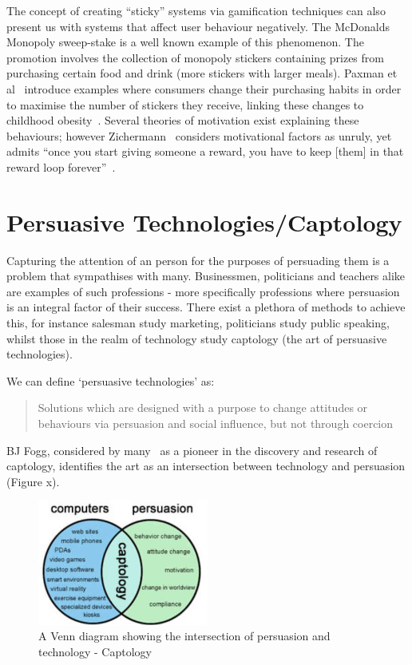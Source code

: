 The concept of creating ``sticky'' systems via gamification techniques can also present us with systems that affect user behaviour negatively. The McDonalds Monopoly sweep-stake is a well known example of this phenomenon. The promotion involves the collection of monopoly stickers containing prizes from purchasing certain food and drink (more stickers with larger meals). Paxman et al~\cite{mcdonalds} introduce examples where consumers change their purchasing habits in order to maximise the number of stickers they receive, linking these changes to childhood obesity~\cite{mcdonalds}. Several theories of motivation exist explaining these behaviours; however Zichermann~\cite{zichermann2011gamification} considers motivational factors as unruly, yet admits ``once you start giving someone a reward, you have to keep [them] in that reward loop forever''~\cite[p.~27]{zichermann2011gamification}.

\section{Persuasive Technologies/Captology}
Capturing the attention of an person for the purposes of persuading them is a problem that sympathises with many. Businessmen, politicians and teachers alike are examples of such professions - more specifically professions where persuasion is an integral factor of their success. There exist a plethora of methods to achieve this, for instance salesman study marketing, politicians study public speaking, whilst those in the realm of technology study captology (the art of persuasive technologies).

We can define `persuasive technologies' as:
\begin{quotation}
\noindent
Solutions which are designed with a purpose to change attitudes or behaviours via persuasion and social influence, but not through coercion~\cite{fogg}
\end{quotation}

BJ Fogg, considered by many~\cite{fogg1}\cite{fogg2} as a pioneer in the discovery and research of captology, identifies the art as an intersection between technology and persuasion (Figure x). 

\begin{figure}[H]
  \centering
    \includegraphics[width=0.5\textwidth]{img/captology-figure-3.png}
      \caption{A Venn diagram showing the intersection of persuasion and technology - Captology}
\end{figure}

